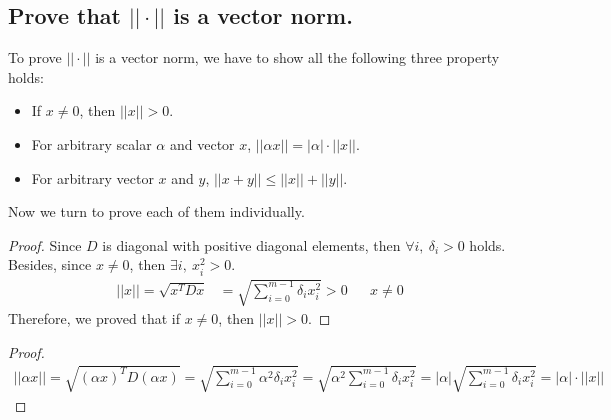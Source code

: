 \documentclass[11pt,a4paper]{article}
\begin{document}
\subsection{Prove that $||\cdot||$ is a vector norm.}
To prove $||\cdot||$ is a vector norm, we have to show all the following three
property holds: 
\begin{itemize}
    \item If $x\not = 0$, then $|| x || > 0$.
    \item For arbitrary scalar $\alpha$ and vector $x$, $||\alpha x|| = | \alpha | \cdot || x || $.
    \item For arbitrary vector $x$ and $y$, $|| x + y || \leq || x || + || y ||$.
\end{itemize}
Now we turn to prove each of them individually.
\begin{proof}
    Since $D$ is diagonal with positive diagonal elements, then $\forall i,\
    \delta_i > 0$ holds. Besides, since $x \not = 0$, then $\exists i,\ x_i^2 > 0$.
    \begin{align}
        || x || = \sqrt{x^T D x} &= \sqrt{\sum_{i=0}^{m-1} \delta_i x_i^2} > 0
        && x \not = 0
    \end{align}
    Therefore, we proved that if $x\not = 0$, then $|| x || > 0$.
\end{proof}
\begin{proof}
    \begin{align}
        || \alpha x || = \sqrt{(\alpha x)^T D (\alpha x)} 
        = \sqrt{\sum_{i=0}^{m-1} \alpha^2 \delta_i x_i^2} 
        = \sqrt{\alpha^2\sum_{i=0}^{m-1}  \delta_i x_i^2} 
        = |\alpha| \sqrt{\sum_{i=0}^{m-1}  \delta_i x_i^2} 
        = |\alpha| \cdot || x ||
    \end{align}
\end{proof}
\end{document}
